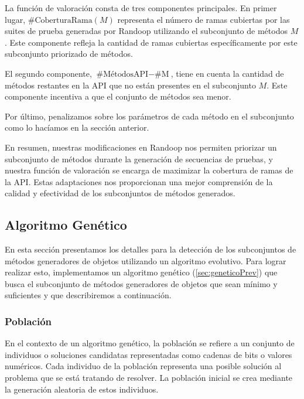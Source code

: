La función de valoración consta de tres componentes principales. En primer lugar, $\text{{\#CoberturaRama}}(M)$ representa el número de ramas cubiertas por las suites de prueba generadas por Randoop utilizando el subconjunto de métodos $M$. Este componente refleja la cantidad de ramas cubiertas específicamente por este subconjunto priorizado de métodos.

El segundo componente, $\text{{\#MétodosAPI}} - \text{{\#M}}$, tiene en cuenta la cantidad de métodos restantes en la API que no están presentes en el subconjunto $M$. Este componente incentiva a que el conjunto de métodos sea menor.

Por último, penalizamos sobre los parámetros de cada método en el subconjunto como lo hacíamos en la sección anterior. 

En resumen, nuestras modificaciones en Randoop nos permiten priorizar un subconjunto de métodos durante la generación de secuencias de pruebas, y nuestra función de valoración se encarga de maximizar la cobertura de ramas de la API. Estas adaptaciones nos proporcionan una mejor comprensión de la calidad y efectividad de los subconjuntos de métodos generados.



\subsection{Algoritmo Genético}
\label{alg:approachGA}

En esta sección presentamos los detalles para la detección de los subconjuntos de métodos generadores de objetos utilizando un algoritmo evolutivo. Para lograr realizar esto, implementamos un algoritmo genético (\ref{sec:geneticoPrev}) que busca el subconjunto de métodos generadores de objetos que sean mínimo y suficientes y que describiremos a continuación.





\subsubsection{Población}

En el contexto de un algoritmo genético, la población se refiere a un conjunto de individuos o soluciones candidatas representadas como cadenas de bits o valores numéricos. Cada individuo de la población representa una posible solución al problema que se está tratando de resolver. La población inicial se crea mediante la generación aleatoria de estos individuos.

